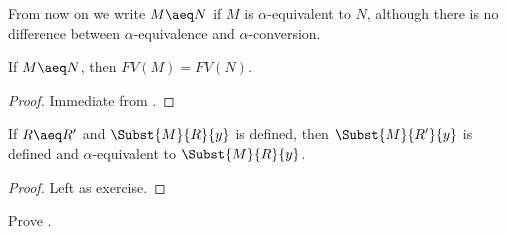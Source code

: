 \documentclass[../../../include/open-logic-section]{subfiles}
\begin{document}
From now on we write $M \aeq N$ if $M$ is $\alpha$-equivalent to
$N$, although there is no difference between $\alpha$-equivalence and
$\alpha$-conversion.

\begin{thm}
  If $M \aeq N$, then $FV(M) = FV(N)$.
\end{thm}
\begin{proof}
  Immediate from .
\end{proof}

\begin{lem}
  If $R \aeq R'$ and $\Subst{M}{R}{y}$ is defined, then $\Subst{M}{R'}{y}$ is
  defined and $\alpha$-equivalent to $\Subst{M}{R}{y}$.
\end{lem}
\begin{proof}
  Left as exercise.
\end{proof}

\begin{prob}
  Prove .
\end{prob}
\end{document}
